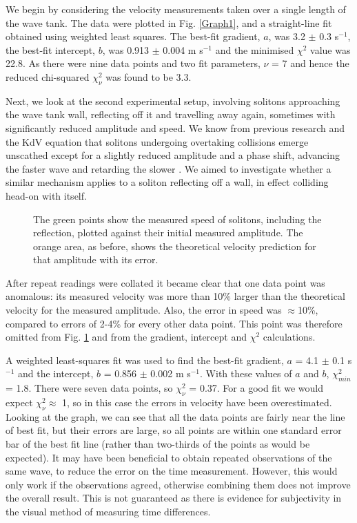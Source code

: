 \documentclass[10pt, twocolumn]{revtex4}    %
\begin{document}
We begin by considering the velocity measurements taken over a single length of the wave tank. The data were plotted in Fig. \ref{Graph1}, and a straight-line fit obtained using weighted least squares. The best-fit gradient, $a$, was 3.2 $\pm$ 0.3 s$^{-1}$, the best-fit intercept, $b$, was 0.913 $\pm$ 0.004 m s$^{-1}$ and the minimised $\chi^2$ value was 22.8. As there were nine data points and two fit parameters, $\nu$ = 7 and hence the reduced chi-squared $\chi_\nu^2$ was found to be 3.3. 


Next, we look at the second experimental setup, involving solitons approaching the wave tank wall, reflecting off it and travelling away again, sometimes with significantly reduced amplitude and speed. We know from previous research and the KdV equation that solitons undergoing overtaking collisions emerge unscathed except for a slightly reduced amplitude and a phase shift, advancing the faster wave and retarding the slower \cite{Segur}. We aimed to investigate whether a similar mechanism applies to a soliton reflecting off a wall, in effect colliding head-on with itself. 

\begin{figure}[h]
\caption{The green points show the measured speed of solitons, including the reflection, plotted against their initial measured amplitude. The orange area, as before, shows the theoretical velocity prediction for that amplitude with its error.}
\label{Graph2}
\end{figure}

After repeat readings were collated it became clear that one data point was anomalous: its measured velocity was more than 10\% larger than the theoretical velocity for the measured amplitude. Also, the error in speed was $\approx$10\%, compared to errors of 2-4\% for every other data point. This point was therefore omitted from Fig. \ref{Graph2} and from the gradient, intercept and $\chi^2$ calculations. 

A weighted least-squares fit was used to find the best-fit gradient, $a$ = 4.1 $\pm$ 0.1 s$^{-1}$ and the intercept, $b$ = 0.856 $\pm$ 0.002 m s$^{-1}$. With these values of $a$ and $b$, $\chi^2_{min}$ = 1.8. There were seven data points, so $\chi_\nu^2$ = 0.37. For a good fit we would expect  $\chi_\nu^2 \approx$ 1, so in this case the errors in velocity have been overestimated. Looking at the graph, we can see that all the data points are fairly near the line of best fit, but their errors are large, so all points are within one standard error bar of the best fit line (rather than two-thirds of the points as would be expected). It may have been beneficial to obtain repeated observations of the same wave, to reduce the error on the time measurement. However, this would only work if the observations agreed, otherwise combining them does not improve the overall result. This is not guaranteed as there is evidence for subjectivity in the visual method of measuring time differences.
\end{document}
